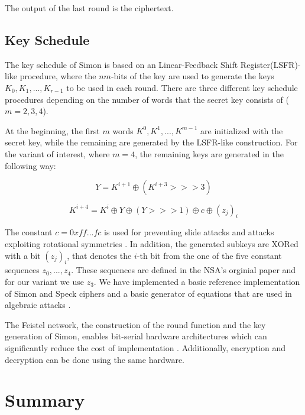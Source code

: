 The output of the last round is the ciphertext.
\subsection{Key Schedule}
The key schedule of Simon is based on an Linear-Feedback Shift Register(LSFR)-like procedure, where the $nm$-bits of the key are used to generate the keys $K_0,K_1,...,K_{r-1}$ to be used in each round. There are three different key schedule procedures depending on the number of words that the secret key consists of ($m=2,3,4$).

At the beginning, the first $m$ words $K^0,K^1,...,K^{m-1}$ are initialized with the secret key, while the remaining are generated by the LSFR-like construction. For the variant of  interest, where $m=4$, the remaining keys are generated in the following way:

\begin{equation}
Y=K^{i+1}\oplus (K^{i+3}>>>3)
\end{equation}

\begin{equation}
K^{i+4}=K^i\oplus Y \oplus (Y>>>1)\oplus c\oplus (z_j)_i
\end{equation}

The constant $c=0xff...fc$ is used for preventing slide attacks and attacks exploiting rotational symmetries \cite{NSAciphers}. In addition, the generated subkeys are XORed with a bit $(z_j)_i$, that denotes the $i$-th bit from the one of the five constant sequences $z_0,...,z_4$. These sequences are defined in the NSA's orginial paper \cite{NSAciphers} and for our variant we use $z_3$. We have implemented a basic reference implementation of Simon and Speck ciphers and a basic generator of equations that are used in algebraic attacks \cite{simonref} .

The Feistel network, the construction of the round function and the key generation of Simon, enables bit-serial hardware architectures which can significantly reduce the cost of implementation \cite{simoneff}. Additionally, encryption and decryption can be done using the
same hardware.

\section{Summary}



